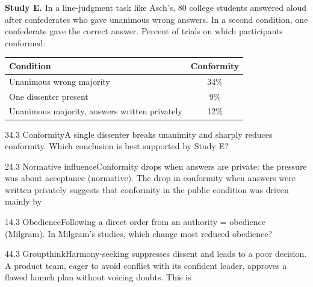 \documentclass[11pt]{article}
\begin{document}
\begin{stimulus}
\textbf{Study E.} In a line-judgment task like Asch's, 80 college students answered aloud after confederates who gave unanimous wrong answers. In a second condition, one confederate gave the correct answer. Percent of trials on which participants conformed:
\begin{center}
\begin{tabular}{lc}
\toprule
Condition & Conformity\\\midrule
Unanimous wrong majority & 34\%\\
One dissenter present & 9\%\\
Unanimous majority, answers written privately & 12\%\\
\bottomrule
\end{tabular}
\end{center}
\end{stimulus}

\begin{q}{3}{4.3 Conformity}{A single dissenter breaks unanimity and sharply reduces conformity.}
Which conclusion is best supported by Study E?
\end{q}

\begin{q}{2}{4.3 Normative influence}{Conformity drops when answers are private: the pressure was about acceptance (normative).}
The drop in conformity when answers were written privately suggests that conformity in the public condition was driven mainly by
\end{q}

\begin{q}{1}{4.3 Obedience}{Following a direct order from an authority = obedience (Milgram).}
In Milgram's studies, which change most reduced obedience?
\end{q}

\begin{q}{4}{4.3 Groupthink}{Harmony-seeking suppresses dissent and leads to a poor decision.}
A product team, eager to avoid conflict with its confident leader, approves a flawed launch plan without voicing doubts. This is
\end{q}
\end{document}

